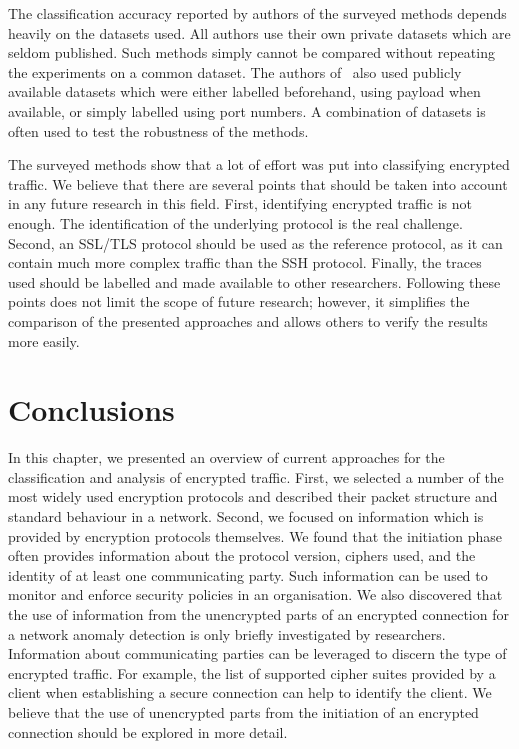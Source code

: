 The classification accuracy reported by authors of the surveyed methods depends heavily on the datasets used. All authors use their own private datasets which are seldom published. Such methods simply cannot be compared without repeating the experiments on a common dataset. The authors of~\cite{Alshammari-2007-flow, Alshammari-2009-Machine, Alshammari-2011-Can, Arndt-2011-Comparison, Sun-2010-Novel, Zhang-2013-Encrypted} also used publicly available datasets which were either labelled beforehand, using payload when available, or simply labelled using port numbers. A combination of datasets is often used to test the robustness of the methods. 

The surveyed methods show that a lot of effort was put into classifying encrypted traffic. We believe that there are several points that should be taken into account in any future research in this field. First, identifying encrypted traffic is not enough. The identification of the underlying protocol is the real challenge. Second, an SSL/TLS protocol should be used as the reference protocol, as it can contain much more complex traffic than the SSH protocol. Finally, the traces used should be labelled and made available to other researchers. Following these points does not limit the scope of future research; however, it simplifies the comparison of the presented approaches and allows others to verify the results more easily.




\section{Conclusions} \label{sec:enc-conclusions}

In this chapter, we presented an overview of current approaches for the classification and analysis of encrypted traffic. First, we selected a number of the most widely used encryption protocols and described their packet structure and standard behaviour in a network. Second, we focused on information which is provided by encryption protocols themselves. We found that the initiation phase often provides information about the protocol version, ciphers used, and the identity of at least one communicating party. Such information can be used to monitor and enforce security policies in an organisation. We also discovered that the use of information from the unencrypted parts of an encrypted connection for a network anomaly detection is only briefly investigated by researchers. Information about communicating parties can be leveraged to discern the type of encrypted traffic. For example, the list of supported cipher suites provided by a client when establishing a secure connection can help to identify the client. We believe that the use of unencrypted parts from the initiation of an encrypted connection should be explored in more detail.

